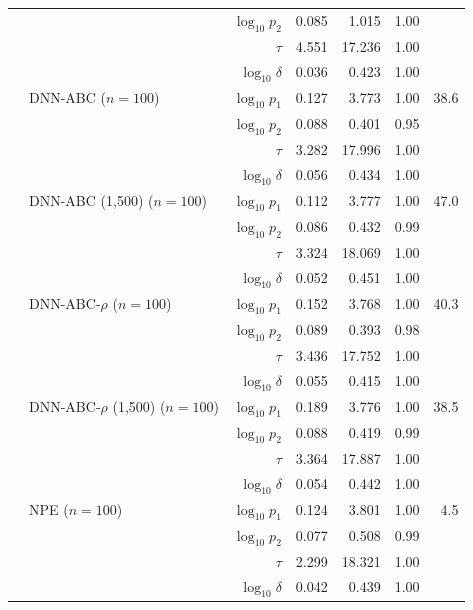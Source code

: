 \begin{tabular}{llrrrrr}
 &  & $\log_{10}p_2$ & 0.085 & 1.015 & 1.00 &  \\
 &  & $\tau$ & 4.551 & 17.236 & 1.00 &  \\
 &  & $\log_{10}\delta$ & 0.036 & 0.423 & 1.00 &  \\
 & DNN-ABC ($n=100$) & $\log_{10}p_1$ & 0.127 & 3.773 & 1.00 & 38.6 \\
 &  & $\log_{10}p_2$ & 0.088 & 0.401 & 0.95 &  \\
 &  & $\tau$ & 3.282 & 17.996 & 1.00 &  \\
 &  & $\log_{10}\delta$ & 0.056 & 0.434 & 1.00 &  \\
 & DNN-ABC (1,500) ($n=100$) & $\log_{10}p_1$ & 0.112 & 3.777 & 1.00 & 47.0 \\
 &  & $\log_{10}p_2$ & 0.086 & 0.432 & 0.99 &  \\
 &  & $\tau$ & 3.324 & 18.069 & 1.00 &  \\
 &  & $\log_{10}\delta$ & 0.052 & 0.451 & 1.00 &  \\
 & DNN-ABC-$\rho$ ($n=100$) & $\log_{10}p_1$ & 0.152 & 3.768 & 1.00 & 40.3 \\
 &  & $\log_{10}p_2$ & 0.089 & 0.393 & 0.98 &  \\
 &  & $\tau$ & 3.436 & 17.752 & 1.00 &  \\
 &  & $\log_{10}\delta$ & 0.055 & 0.415 & 1.00 &  \\
 & DNN-ABC-$\rho$ (1,500) ($n=100$) & $\log_{10}p_1$ & 0.189 & 3.776 & 1.00 & 38.5 \\
 &  & $\log_{10}p_2$ & 0.088 & 0.419 & 0.99 &  \\
 &  & $\tau$ & 3.364 & 17.887 & 1.00 &  \\
 &  & $\log_{10}\delta$ & 0.054 & 0.442 & 1.00 &  \\
 & NPE ($n=100$) & $\log_{10}p_1$ & 0.124 & 3.801 & 1.00 & 4.5 \\
 &  & $\log_{10}p_2$ & 0.077 & 0.508 & 0.99 &  \\
 &  & $\tau$ & 2.299 & 18.321 & 1.00 &  \\
 &  & $\log_{10}\delta$ & 0.042 & 0.439 & 1.00 &  \\
\bottomrule
\end{tabular}
